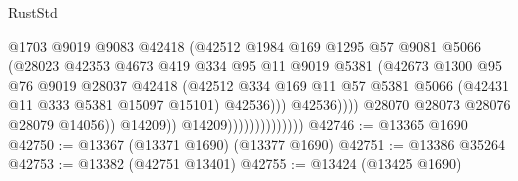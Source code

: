 \begin{lexlean}{RustStd}
\begin{coremodule}
                                              @1703
                                              @9019
                                              @9083
                                              @42418
                                              (@42512
                                                @1984
                                                @169
                                                @1295
                                                @57
                                                @9081
                                                @5066
                                                (@28023
                                                  @42353
                                                  @4673
                                                  @419
                                                  @334
                                                  @95
                                                  @11
                                                  @9019
                                                  @5381
                                                  (@42673
                                                    @1300
                                                    @95
                                                    @76
                                                    @9019
                                                    @28037
                                                    @42418
                                                    (@42512
                                                      @334
                                                      @169
                                                      @11
                                                      @57
                                                      @5381
                                                      @5066
                                                      (@42431 @11 @333 @5381 @15097 @15101)
                                                      @42536)))
                                                @42536))))
                                        @28070
                                        @28073
                                        @28076
                                        @28079
                                        @14056))
                                    @14209))
                                @14209))))))))))))))
@42746 := @13365 @1690
@42750 := @13367 (@13371 @1690) (@13377 @1690)
@42751 := @13386 @35264
@42753 := @13382 (@42751 @13401)
@42755 := @13424 (@13425 @1690)

\end{coremodule}
\end{lexlean}
